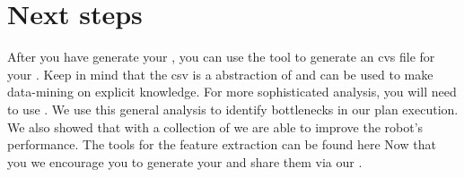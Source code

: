 \section{Next steps}
After you have generate your \neem, you can use the tool  to generate an cvs file for your \neem.
Keep in mind that the csv is a abstraction of \neemnar and can be used to make data-mining on explicit knowledge.
For more sophisticated analysis, you will need to use \knowrob. 
We use this general analysis to identify bottlenecks in our plan execution.
We also showed that with a collection of \neems we are able to improve the robot's performance.
The tools for the feature extraction can be found here 
Now that you we encourage you to generate your \neems and share them via our \neemhub.


